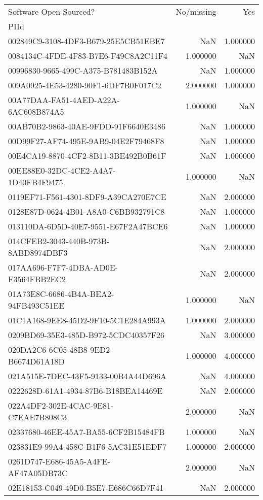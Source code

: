\begin{tabular}{lrr}
\toprule
Software Open Sourced? & No/missing & Yes \\
PIId &  &  \\
\midrule
002849C9-3108-4DF3-B679-25E5CB51EBE7 & NaN & 1.000000 \\
0084134C-4FDE-4F83-B7E6-F49C8A2C11F4 & 1.000000 & NaN \\
00996830-9665-499C-A375-B781483B152A & NaN & 1.000000 \\
009A0925-4E53-4280-90F1-6DF7B0F017C2 & 2.000000 & 1.000000 \\
00A77DAA-FA51-4AED-A22A-6AC608B874A5 & 1.000000 & NaN \\
00AB70B2-9863-40AE-9FDD-91F6640E3486 & NaN & 1.000000 \\
00D99F27-AF74-495E-9AB9-04E2F79468F8 & NaN & 1.000000 \\
00E4CA19-8870-4CF2-8B11-3BE492B0B61F & NaN & 1.000000 \\
00EE88E0-32DC-4CE2-A4A7-1D40FB4F9475 & 1.000000 & NaN \\
0119EF71-F561-4301-8DF9-A39CA270E7CE & NaN & 2.000000 \\
0128E87D-0624-4B01-A8A0-C6BB932791C8 & NaN & 1.000000 \\
013110DA-6D5D-40E7-9551-E67F2A47BCE6 & NaN & 1.000000 \\
014CFEB2-3043-440B-973B-8ABD8974DBF3 & NaN & 2.000000 \\
017AA696-F7F7-4DBA-AD0E-F3564FBB2EC2 & NaN & 2.000000 \\
01A73E8C-6686-4B4A-BEA2-94FB493C51EE & 1.000000 & NaN \\
01C1A168-9EE8-45D2-9F10-5C1E284A993A & 1.000000 & 2.000000 \\
0209BD69-35E3-485D-B972-5CDC40357F26 & NaN & 3.000000 \\
020DA2C6-6C05-48B8-9ED2-B6674D61A18D & 1.000000 & 4.000000 \\
021A515E-7DEC-43F5-9133-00B4A44D696A & NaN & 4.000000 \\
0222628D-61A1-4934-87B6-B18BEA14469E & NaN & 2.000000 \\
022A4DF2-302E-4CAC-9E81-C7EAE7B808C3 & 2.000000 & NaN \\
02337680-46EE-45A7-BA55-6CF2B15484FB & 1.000000 & NaN \\
023831E9-99A4-458C-B1F6-5AC31E51EDF7 & 1.000000 & 2.000000 \\
0261D747-E686-45A5-A4FE-AF47A05DB73C & 2.000000 & NaN \\
02E18153-C049-49D0-B5E7-E686C66D7F41 & NaN & 2.000000 \\

\end{tabular}
